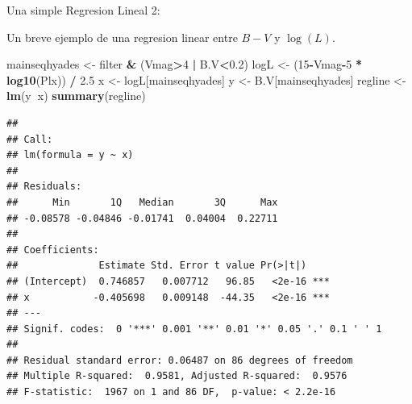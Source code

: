 \documentclass[ignorenonframetext,]{beamer}
\newenvironment{Shaded}{\begin{snugshade}}{\end{snugshade}}
\newcommand{\KeywordTok}[1]{\textcolor[rgb]{0.13,0.29,0.53}{\textbf{#1}}}
\newcommand{\DecValTok}[1]{\textcolor[rgb]{0.00,0.00,0.81}{#1}}
\newcommand{\FloatTok}[1]{\textcolor[rgb]{0.00,0.00,0.81}{#1}}
\newcommand{\StringTok}[1]{\textcolor[rgb]{0.31,0.60,0.02}{#1}}
\newcommand{\OperatorTok}[1]{\textcolor[rgb]{0.81,0.36,0.00}{\textbf{#1}}}
\newcommand{\NormalTok}[1]{#1}
\begin{document}
\begin{frame}[fragile]

\begin{block}{Una simple Regresion Lineal 2:}

Un breve ejemplo de una regresion linear entre \(B-V\) y \(\log(L)\).

\begin{Shaded}
\begin{Highlighting}[]
\NormalTok{mainseqhyades <-}\StringTok{ }\NormalTok{filter }\OperatorTok{&}\StringTok{ }\NormalTok{(Vmag}\OperatorTok{>}\DecValTok{4} \OperatorTok{|}\StringTok{ }\NormalTok{B.V}\OperatorTok{<}\FloatTok{0.2}\NormalTok{)}
\NormalTok{logL <-}\StringTok{ }\NormalTok{(}\DecValTok{15}\OperatorTok{-}\NormalTok{Vmag}\OperatorTok{-}\DecValTok{5} \OperatorTok{*}\StringTok{ }\KeywordTok{log10}\NormalTok{(Plx)) }\OperatorTok{/}\StringTok{ }\FloatTok{2.5}
\NormalTok{x <-}\StringTok{ }\NormalTok{logL[mainseqhyades]}
\NormalTok{y <-}\StringTok{ }\NormalTok{B.V[mainseqhyades]}
\NormalTok{regline <-}\StringTok{ }\KeywordTok{lm}\NormalTok{(y}\OperatorTok{~}\NormalTok{x)}
\KeywordTok{summary}\NormalTok{(regline)}
\end{Highlighting}
\end{Shaded}

\begin{verbatim}
## 
## Call:
## lm(formula = y ~ x)
## 
## Residuals:
##      Min       1Q   Median       3Q      Max 
## -0.08578 -0.04846 -0.01741  0.04004  0.22711 
## 
## Coefficients:
##              Estimate Std. Error t value Pr(>|t|)    
## (Intercept)  0.746857   0.007712   96.85   <2e-16 ***
## x           -0.405698   0.009148  -44.35   <2e-16 ***
## ---
## Signif. codes:  0 '***' 0.001 '**' 0.01 '*' 0.05 '.' 0.1 ' ' 1
## 
## Residual standard error: 0.06487 on 86 degrees of freedom
## Multiple R-squared:  0.9581, Adjusted R-squared:  0.9576 
## F-statistic:  1967 on 1 and 86 DF,  p-value: < 2.2e-16
\end{verbatim}

\end{block}

\end{frame}
\end{document}
